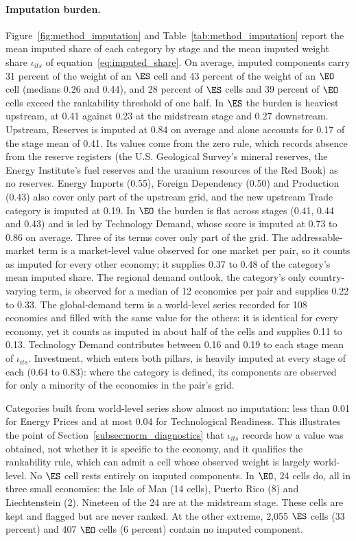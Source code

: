 \paragraph{Imputation burden.} Figure~\ref{fig:method_imputation} and
Table~\ref{tab:method_imputation} report the mean imputed share of each category by stage and the
mean imputed weight share $\iota_{its}$ of equation~\eqref{eq:imputed_share}. On average, imputed
components carry 31 percent of the weight of an $\ES$ cell and 43 percent of the weight of an
$\EO$ cell (medians 0.26 and 0.44), and 28 percent of $\ES$ cells and 39 percent of $\EO$ cells
exceed the rankability threshold of one half. In $\ES$ the burden is heaviest upstream, at 0.41
against 0.23 at the midstream stage and 0.27 downstream. Upstream, Reserves is imputed at 0.84 on
average and alone accounts for 0.17 of the stage mean of 0.41. Its values come from the zero rule,
which records absence from the reserve registers (the U.S. Geological Survey's mineral reserves,
the Energy Institute's fuel reserves and the uranium resources of the Red Book) as no reserves.
Energy Imports (0.55), Foreign Dependency (0.50) and Production (0.43) also cover only part of
the upstream grid, and the new upstream Trade category is imputed at 0.19. In $\EO$ the burden is
flat across stages (0.41, 0.44 and 0.43) and is led by
Technology Demand, whose score is imputed at 0.73 to 0.86 on average. Three of its terms cover
only part of the grid. The addressable-market term is a market-level value observed for one
market per pair, so it counts as imputed for every other economy; it supplies 0.37 to 0.48 of the
category's mean imputed share. The regional demand outlook, the category's only country-varying
term, is observed for a median of 12 economies per pair and supplies 0.22 to 0.33. The
global-demand term is a world-level series recorded for 108 economies and filled with the same
value for the others: it is identical for every economy, yet it counts as imputed in about half
of the cells and supplies 0.11 to 0.13. Technology Demand contributes between 0.16 and 0.19 to
each stage mean of $\iota_{its}$. Investment, which enters both pillars, is heavily imputed at
every stage of each (0.64 to 0.83): where the category is defined, its components are observed
for only a minority of the economies in the pair's grid.

Categories built from world-level series show almost no imputation: less than 0.01 for Energy
Prices and at most 0.04 for Technological Readiness. This illustrates the point of
Section~\ref{subsec:norm_diagnostics} that $\iota_{its}$ records how a value was obtained, not
whether it is specific to the economy, and it qualifies the rankability rule, which can admit a
cell whose observed weight is largely world-level. No $\ES$ cell rests entirely on imputed
components. In $\EO$, 24 cells do, all in three small economies: the Isle of Man (14 cells),
Puerto Rico (8) and Liechtenstein (2). Nineteen of the 24 are at the midstream stage. These cells
are kept and flagged but are never ranked. At the other extreme, 2,055 $\ES$ cells (33 percent)
and 407 $\EO$ cells (6 percent) contain no imputed component.

